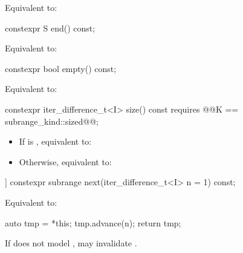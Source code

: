 \begin{addedblock}
\begin{itemdescr}
\pnum
\effects Equivalent to: 
\end{itemdescr}

%
\begin{itemdecl}
constexpr S end() const;
\end{itemdecl}

\begin{itemdescr}
\pnum
\effects Equivalent to: 
\end{itemdescr}

%
\begin{itemdecl}
constexpr bool empty() const;
\end{itemdecl}

\begin{itemdescr}
\pnum
\effects Equivalent to: 
\end{itemdescr}

%
\begin{itemdecl}
constexpr iter_difference_t<I> size() const
  requires @\newtxt{(}@K == subrange_kind::sized@\newtxt{)}@;
\end{itemdecl}

\begin{itemdescr}
\pnum
\effects
\begin{itemize}
\item If  is , equivalent to: 
\item Otherwise, equivalent to: 
\end{itemize}
\end{itemdescr}

%
\begin{itemdecl}
[[nodiscard]] constexpr subrange next(iter_difference_t<I> n = 1) const;
\end{itemdecl}

\begin{itemdescr}
\pnum
\effects Equivalent to:
\begin{codeblock}
auto tmp = *this;
tmp.advance(n);
return tmp;
\end{codeblock}

\pnum
\begin{note}
If  does not model , 
may invalidate .
\end{note}
\end{itemdescr}


\end{addedblock}
